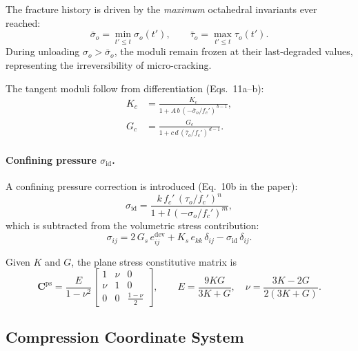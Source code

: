 The fracture history is driven by the \emph{maximum} octahedral invariants
ever reached:
\[
  \bar\sigma_o = \min_{t'\le t} \sigma_o(t'),
  \qquad
  \bar\tau_o   = \max_{t'\le t} \tau_o(t').
\]
During unloading $\sigma_o > \bar\sigma_o$, the moduli remain frozen at
their last-degraded values, representing the irreversibility of
micro-cracking.

The tangent moduli follow from differentiation (Eqs.~11a--b):
\begin{align}
  K_c &= \frac{K_e}{1 + A\,b\,(-\bar\sigma_o/f_c')^{\,b-1}},
  \label{eq:kb-kc}
  \\[4pt]
  G_c &= \frac{G_e}{1 + c\,d\,(\bar\tau_o/f_c')^{\,d-1}}.
  \label{eq:kb-gc}
\end{align}

\paragraph{Confining pressure $\sigma_{\text{id}}$.}
A confining pressure correction is introduced (Eq.~10b in the paper):
\begin{equation}
  \sigma_{\text{id}} = \frac{k\,f_c'\,(\tau_o/f_c')^{n}}{1 + l\,(-\sigma_o/f_c')^{m}},
  \label{eq:kb-sigma-id}
\end{equation}
which is subtracted from the volumetric stress contribution:
\begin{equation}
  \sigma_{ij} = 2\,G_s\,e^{\text{dev}}_{ij} + K_s\,e_{kk}\,\delta_{ij} - \sigma_{\text{id}}\,\delta_{ij}.
  \label{eq:kb-stress-with-sigma-id}
\end{equation}

Given $K$ and $G$, the plane stress constitutive matrix is
\[
  \mathbf{C}^{\text{ps}} = \frac{E}{1-\nu^2}
  \begin{bmatrix}
    1 & \nu & 0 \\ \nu & 1 & 0 \\ 0 & 0 & \tfrac{1-\nu}{2}
  \end{bmatrix},
  \qquad
  E = \frac{9KG}{3K+G},
  \quad
  \nu = \frac{3K-2G}{2(3K+G)}.
\]

\subsection{Compression Coordinate System}
\label{ssec:kb-compression-coords}

